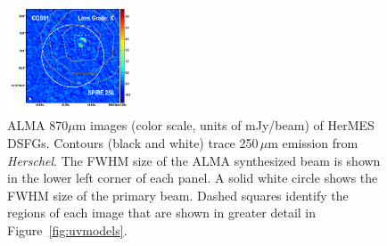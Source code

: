 \documentclass[iop]{emulateapj}
\begin{document}
\begin{figure}[!tbp]
\begin{centering}
\includegraphics[width=0.331\textwidth]{../Figures/overlays/COS01_870_250.pdf}
\end{centering}

\caption{ ALMA 870$\mu$m images (color scale, units of mJy/beam) of HerMES
DSFGs.  Contours (black and white) trace 250$\,\mu$m emission from {\it
Herschel}.  The FWHM size of the ALMA synthesized beam is shown in the lower
left corner of each panel.  A solid white circle shows the FWHM size of the
primary beam.  Dashed squares identify the regions of each image that are shown
in greater detail in Figure~\ref{fig:uvmodels}.  \label{fig:imaging}}
\addtocounter{figure}{-1}

\end{figure}
\end{document}
